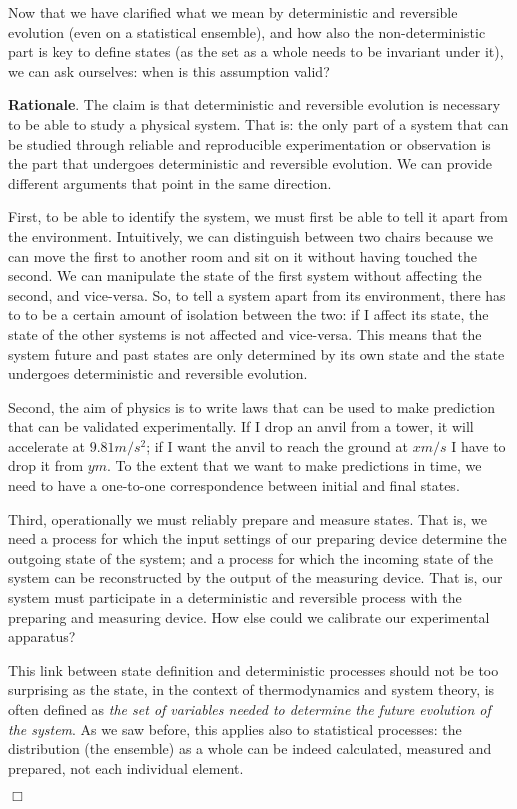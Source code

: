 \documentclass[aps,pra,10pt,twocolumn,floatfix,nofootinbib]{revtex4-1}
\theoremstyle{definition}
\newenvironment{rationale}{\textbf{Rationale}.}{$\Box$}
\begin{document}
Now that we have clarified what we mean by deterministic and reversible evolution (even on a statistical ensemble), and how also the non-deterministic part is key to define states (as the set as a whole needs to be invariant under it), we can ask ourselves: when is this assumption valid?

\begin{rationale}
The claim is that deterministic and reversible evolution is necessary to be able to study a physical system. That is: the only part of a system that can be studied through reliable and reproducible experimentation or observation is the part that undergoes deterministic and reversible evolution. We can provide different arguments that point in the same direction.

First, to be able to identify the system, we must first be able to tell it apart from the environment. Intuitively, we can distinguish between two chairs because we can move the first to another room and sit on it without having touched the second. We can manipulate the state of the first system without affecting the second, and vice-versa. So, to tell a system apart from its environment, there has to to be a certain amount of isolation between the two: if I affect its state, the state of the other systems is not affected and vice-versa. This means that the system future and past states are only determined by its own state and the state undergoes deterministic and reversible evolution.

Second, the aim of physics is to write laws that can be used to make prediction that can be validated experimentally. If I drop an anvil from a tower, it will accelerate at $9.81 m/s^2$; if I want the anvil to reach the ground at $x m/s$ I have to drop it from $y m$. To the extent that we want to make predictions in time, we need to have a one-to-one correspondence between initial and final states.

Third, operationally we must reliably prepare and measure states. That is, we need a process for which the input settings of our preparing device determine the outgoing state of the system; and a process for which the incoming state of the system can be reconstructed by the output of the measuring device. That is, our system must participate in a deterministic and reversible process with the preparing and measuring device. How else could we calibrate our experimental apparatus?

This link between state definition and deterministic processes should not be too surprising as the state, in the context of thermodynamics and system theory, is often defined as \emph{the set of variables needed to determine the future evolution of the system}. As we saw before, this applies also to statistical processes: the distribution (the ensemble) as a whole can be indeed calculated, measured and prepared, not each individual element.


\end{rationale}
\end{document}
